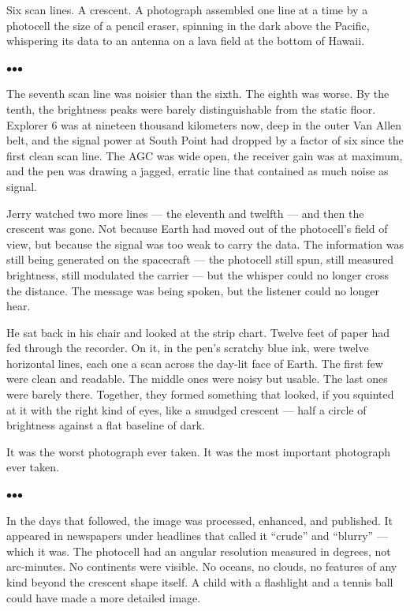 \documentclass[12pt, letterpaper]{article}
\begin{document}
Six scan lines. A crescent. A photograph assembled one line at a time by a photocell the size of a pencil eraser, spinning in the dark above the Pacific, whispering its data to an antenna on a lava field at the bottom of Hawaii.

\bigskip
\centerline{$\bullet$\quad$\bullet$\quad$\bullet$}
\bigskip

The seventh scan line was noisier than the sixth. The eighth was worse. By the tenth, the brightness peaks were barely distinguishable from the static floor. Explorer 6 was at nineteen thousand kilometers now, deep in the outer Van Allen belt, and the signal power at South Point had dropped by a factor of six since the first clean scan line. The AGC was wide open, the receiver gain was at maximum, and the pen was drawing a jagged, erratic line that contained as much noise as signal.

Jerry watched two more lines --- the eleventh and twelfth --- and then the crescent was gone. Not because Earth had moved out of the photocell's field of view, but because the signal was too weak to carry the data. The information was still being generated on the spacecraft --- the photocell still spun, still measured brightness, still modulated the carrier --- but the whisper could no longer cross the distance. The message was being spoken, but the listener could no longer hear.

He sat back in his chair and looked at the strip chart. Twelve feet of paper had fed through the recorder. On it, in the pen's scratchy blue ink, were twelve horizontal lines, each one a scan across the day-lit face of Earth. The first few were clean and readable. The middle ones were noisy but usable. The last ones were barely there. Together, they formed something that looked, if you squinted at it with the right kind of eyes, like a smudged crescent --- half a circle of brightness against a flat baseline of dark.

It was the worst photograph ever taken. It was the most important photograph ever taken.

\bigskip
\centerline{$\bullet$\quad$\bullet$\quad$\bullet$}
\bigskip

In the days that followed, the image was processed, enhanced, and published. It appeared in newspapers under headlines that called it ``crude'' and ``blurry'' --- which it was. The photocell had an angular resolution measured in degrees, not arc-minutes. No continents were visible. No oceans, no clouds, no features of any kind beyond the crescent shape itself. A child with a flashlight and a tennis ball could have made a more detailed image.
\end{document}
